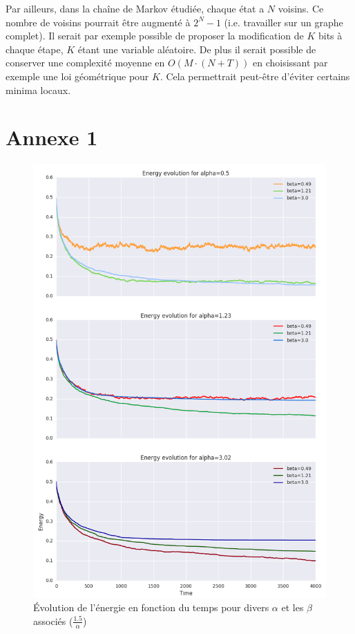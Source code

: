 \documentclass[twocolumn]{article}
\begin{document}
		Par ailleurs, dans la chaîne de Markov étudiée, chaque état a $N$ voisins. Ce nombre de voisins pourrait être augmenté à $2^N-1$ (i.e. travailler sur un graphe complet). Il serait par exemple possible de proposer la modification de $K$ bits à chaque étape, $K$ étant une variable aléatoire. De plus il serait possible de conserver une complexité moyenne en $O(M\cdot(N+T))$ en choisissant par exemple une loi géométrique pour $K$.
		Cela permettrait peut-être d'éviter certains minima locaux.
		
\newpage
\appendix
\section{Annexe 1}
\begin{figure}[!h]
	\includegraphics[width=\columnwidth]{../tobekept/ex1_8526750515376798568-r.png}
	\caption{Évolution de l'énergie en fonction du temps pour divers $\alpha$ et les $\beta$ associés ($\frac{1.5}{\alpha}$)}
\end{figure}
\end{document}
